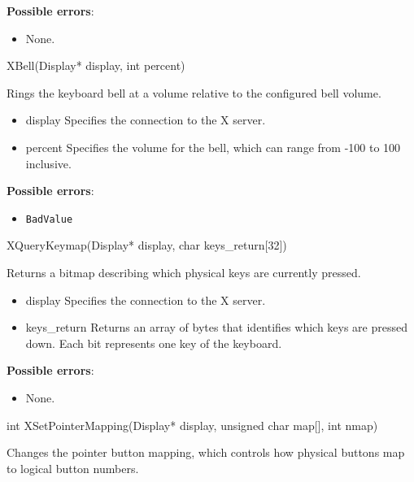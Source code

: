 \documentclass{report}
\begin{document}
\begin{itemize}
        \textbf{Possible errors}:
        \begin{itemize}
            \item None.
        \end{itemize}

        \begin{cppcode}
        XBell(Display* display, int percent)
        \end{cppcode}
        \bigbreak \noindent
        Rings the keyboard bell at a volume relative to the configured bell volume.

        \begin{itemize}
            \item display Specifies the connection to the X server.
            \item percent Specifies the volume for the bell, which can range from -100 to 100 inclusive.
        \end{itemize}

        \textbf{Possible errors}:
        \begin{itemize}
            \item \texttt{BadValue}
        \end{itemize}

        \begin{cppcode}
            XQueryKeymap(Display* display, char keys_return[32])
        \end{cppcode}
        \bigbreak \noindent
        Returns a bitmap describing which physical keys are currently pressed.

        \begin{itemize}
            \item display Specifies the connection to the X server.
            \item keys\_return Returns an array of bytes that identifies which keys are pressed down. Each bit represents one key of the keyboard.
        \end{itemize}

        \textbf{Possible errors}:
        \begin{itemize}
            \item None.
        \end{itemize}

        \begin{cppcode}
        int XSetPointerMapping(Display* display, unsigned char map[], int nmap)
        \end{cppcode}
        \bigbreak \noindent
        Changes the pointer button mapping, which controls how physical buttons map to logical button numbers.


\end{itemize}
\end{document}
